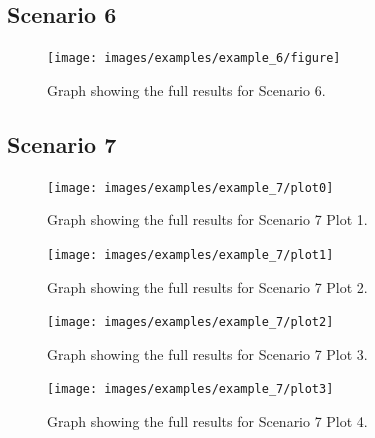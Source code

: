 \documentclass{l4proj}
\begin{document}
\clearpage
\subsection{Scenario 6}\label{apen:scen6}

\begin{figure}
    \centering
    \texttt{[image: images/examples/example\_6/figure]}
    ~
    \caption{Graph showing the full results for Scenario 6.}
    \label{fig:example6}
\end{figure}

\clearpage
\subsection{Scenario 7}\label{apen:scen7}

\begin{figure}[htbp]
    \centering
    \texttt{[image: images/examples/example\_7/plot0]}
    ~
    \caption{Graph showing the full results for Scenario 7 Plot 1.}
    \label{fig:example7_plot1}
\end{figure}

\clearpage

\begin{figure}[htbp]
    \centering
    \texttt{[image: images/examples/example\_7/plot1]}
    ~
    \caption{Graph showing the full results for Scenario 7 Plot 2.}
    \label{fig:example7_plo2}
\end{figure}

\clearpage
\begin{figure}[htbp]
    \centering
    \texttt{[image: images/examples/example\_7/plot2]}
    ~
    \caption{Graph showing the full results for Scenario 7 Plot 3.}
    \label{fig:example7_plot3}
\end{figure}

\clearpage
\begin{figure}[htbp]
    \centering
    \texttt{[image: images/examples/example\_7/plot3]}
    ~
    \caption{Graph showing the full results for Scenario 7 Plot 4.}
    \label{fig:example7_plot4}
\end{figure}






\end{document}
